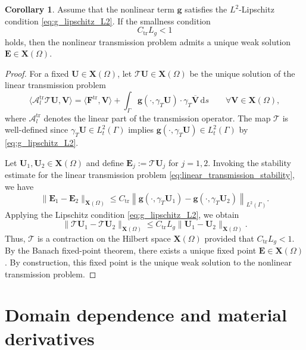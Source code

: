 \documentclass[12pt,reqno]{amsart}
\theoremstyle{definition}
\newtheorem{coro}[theo]{Corollary}
\numberwithin{equation}{section}
\begin{document}
\begin{coro}
\label{th:existence_ntc}
Assume that the nonlinear term $\mathbf{g}$ satisfies the $L^2$-Lipschitz condition \eqref{eq:g_lipschitz_L2}. If the smallness condition
\[
C_{\mathrm{tr}} L_g < 1
\]
holds, then the nonlinear transmission problem admits a unique weak solution $\mathbf{E} \in \mathbf{X}(\Omega)$.
\end{coro}

\begin{proof}
For a fixed $\mathbf{U} \in \mathbf{X}(\Omega)$, let $\mathcal{T}\mathbf{U} \in \mathbf{X}(\Omega)$ be the unique solution of the linear transmission problem
\[
\langle \mathscr {A}_l^{\mathrm{tr}} \mathcal{T}\mathbf{U}, \mathbf{V} \rangle = \langle \mathbf{F}^{\mathrm{tr}}, \mathbf{V} \rangle + \int_{\Gamma} \mathbf{g}(\cdot, \gamma_T \mathbf{U}) \cdot \gamma_T \overline{\mathbf{V}} \,\mathrm{d}s \qquad \forall \mathbf{V} \in \mathbf{X}(\Omega),
\]
where $\mathscr {A}_l^{\mathrm{tr}}$ denotes the linear part of the transmission operator. The map $\mathcal{T}$ is well-defined since $\gamma_T \mathbf{U} \in L_t^2(\Gamma)$ implies $\mathbf{g}(\cdot, \gamma_T \mathbf{U}) \in L_t^2(\Gamma)$ by \eqref{eq:g_lipschitz_L2}.

Let $\mathbf{U}_1, \mathbf{U}_2 \in \mathbf{X}(\Omega)$ and define $\mathbf{E}_j := \mathcal{T}\mathbf{U}_j$ for $j=1,2$. Invoking the stability estimate for the linear transmission problem \eqref{eq:linear_transmission_stability}, we have
\[
\|\mathbf{E}_1 - \mathbf{E}_2\|_{\mathbf{X}(\Omega)} \le C_{\mathrm{tr}} \left\| \mathbf{g}(\cdot, \gamma_T \mathbf{U}_1) - \mathbf{g}(\cdot, \gamma_T \mathbf{U}_2) \right\|_{L^2(\Gamma)}.
\]
Applying the Lipschitz condition \eqref{eq:g_lipschitz_L2}, we obtain
\[
\|\mathcal{T}\mathbf{U}_1 - \mathcal{T}\mathbf{U}_2\|_{\mathbf{X}(\Omega)} \le C_{\mathrm{tr}} L_g \|\mathbf{U}_1 - \mathbf{U}_2\|_{\mathbf{X}(\Omega)}.
\]
Thus, $\mathcal{T}$ is a contraction on the Hilbert space $\mathbf{X}(\Omega)$ provided that $C_{\mathrm{tr}} L_g < 1$. By the Banach fixed-point theorem, there exists a unique fixed point $\mathbf{E} \in \mathbf{X}(\Omega)$. By construction, this fixed point is the unique weak solution to the nonlinear transmission problem.
\end{proof}


\section{Domain dependence and material derivatives}
\label{sec:3}
\end{document}
